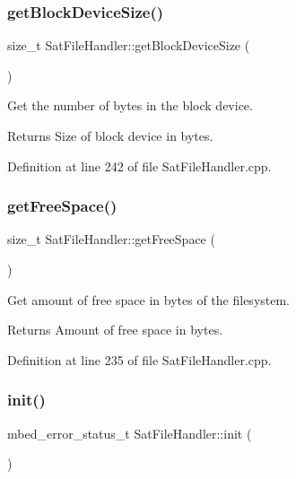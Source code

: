 \subsubsection{\texorpdfstring{getBlockDeviceSize()}{getBlockDeviceSize()}}
{\footnotesize\ttfamily size\+\_\+t Sat\+File\+Handler\+::get\+Block\+Device\+Size (\begin{DoxyParamCaption}{ }\end{DoxyParamCaption})}



Get the number of bytes in the block device. 

\begin{DoxyReturn}{Returns}
Size of block device in bytes. 
\end{DoxyReturn}


Definition at line 242 of file Sat\+File\+Handler.\+cpp.

\mbox{\label{class_sat_file_handler_ae4b0b4244befa3a3d1fdfc451ae248f0}} 
\subsubsection{\texorpdfstring{getFreeSpace()}{getFreeSpace()}}
{\footnotesize\ttfamily size\+\_\+t Sat\+File\+Handler\+::get\+Free\+Space (\begin{DoxyParamCaption}{ }\end{DoxyParamCaption})}



Get amount of free space in bytes of the filesystem. 

\begin{DoxyReturn}{Returns}
Amount of free space in bytes. 
\end{DoxyReturn}


Definition at line 235 of file Sat\+File\+Handler.\+cpp.

\mbox{\label{class_sat_file_handler_aacd220dabbabf695b7ee32e526baeb5e}} 
\subsubsection{\texorpdfstring{init()}{init()}}
{\footnotesize\ttfamily mbed\+\_\+error\+\_\+status\+\_\+t Sat\+File\+Handler\+::init (\begin{DoxyParamCaption}{ }\end{DoxyParamCaption})}




